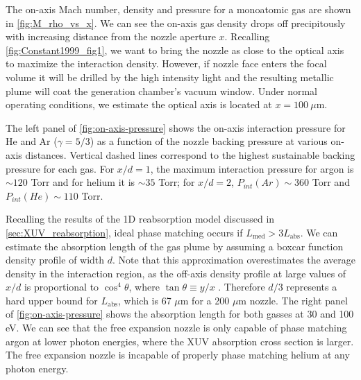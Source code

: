 The on-axis Mach number, density and pressure for a monoatomic gas are shown in \cref{fig:M_rho_vs_x}. We can see the on-axis gas density drops off precipitously with increasing distance from the nozzle aperture $x$. Recalling \cref{fig:Constant1999_fig1}, we want to bring the nozzle as close to the optical axis to maximize the interaction density. However, if nozzle face enters the focal volume it will be drilled by the high intensity light and the resulting metallic plume will coat the generation chamber's vacuum window. Under normal operating conditions, we estimate the optical axis is located at $x=100 \ \mu$m.


The left panel of \cref{fig:on-axis-pressure} shows the on-axis interaction pressure for He and Ar ($\gamma = 5/3$) as a function of the nozzle backing pressure at various on-axis distances. Vertical dashed lines correspond to the highest sustainable backing pressure for each gas. For $x/d = 1$, the maximum interaction pressure for argon is $\sim 120$ Torr and for helium it is $\sim 35$ Torr; for $x/d = 2$, $P_{int}(Ar) \sim 360$ Torr and $P_{int}(He) \sim 110$ Torr.

Recalling the results of the 1D reabsorption model discussed in \cref{sec:XUV_reabsorption}, ideal phase matching occurs if $L_{\textrm{med}} > 3 L_{\textrm{abs}}$. We can estimate the absorption length of the gas plume by assuming a boxcar function density profile of width $d$. Note that this approximation overestimates the average density in the interaction region, as the off-axis density profile at large values of $x/d$ is proportional to $\cos^4 \theta$, where $\tan \theta \equiv y/x$ \cite{millerFreeJetSources1988}. Therefore $d/3$ represents a hard upper bound for $L_{\textrm{abs}}$, which is 67 $\mu$m for a 200 $\mu$m nozzle. The right panel of \cref{fig:on-axis-pressure} shows the absorption length for both gasses at 30 and 100 eV. We can see that the free expansion nozzle is only capable of phase matching argon at lower photon energies, where the XUV absorption cross section is larger. The free expansion nozzle is incapable of properly phase matching helium at any photon energy.


